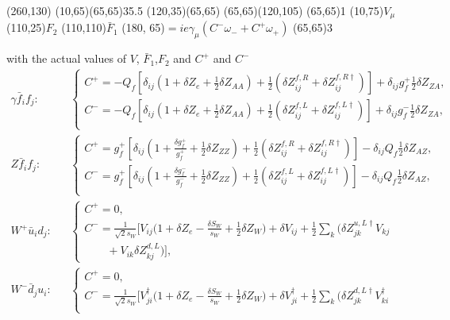 \begin{axopicture}(260,130) %
	\Photon(10,65)(65,65){3}{5.5}
	\Line[arrow](120,35)(65,65)
	\Line[arrow](65,65)(120,105)
	\Vertex(65,65){1}		
	\Text(10,75){$V_\mu$}
	\Text(110,25){$F_2$}
	\Text(110,110){$\bar{F}_1$}
	\Text(180, 65){$=ie\gamma_{\mu}(C^-\omega_-+C^+\omega_+)$}
	\Vertex(65,65){3}
\end{axopicture}
\newline with the actual values of $V$, $\bar{F}_1$,$F_2$ and $C^+$ and $C^-$
\begin{eqnarray}
\gamma\bar{f}_if_j:&&
\begin{cases}
C^+=-Q_f[ \delta_{ij}( 1+\delta Z_e+\frac{1}{2}\delta Z_{AA})+\frac{1}{2}(\delta Z^{f,R}_{ij}+\delta Z^{f,R\dagger}_{ij})]+\delta_{ij}g^+_f\frac{1}{2}\delta Z_{ZA},\\
C^-=-Q_f[ \delta_{ij}( 1+\delta Z_e+\frac{1}{2}\delta Z_{AA})+\frac{1}{2}(\delta Z^{f,L}_{ij}+\delta Z^{f,L\dagger}_{ij})]+\delta_{ij}g^-_f\frac{1}{2}\delta Z_{ZA},\\
\end{cases}\nonumber\\
Z\bar{f}_if_j:&&
\begin{cases}
C^+=g^+_f[ \delta_{ij}( 1+\frac{\delta g^+_f}{g^+_f}+\frac{1}{2}\delta Z_{ZZ})+\frac{1}{2}(\delta Z^{f,R}_{ij}+\delta Z^{f,R\dagger}_{ij})]-\delta_{ij}Q_f\frac{1}{2}\delta Z_{AZ},\\
C^-=g^+_f[ \delta_{ij}( 1+\frac{\delta g^-_f}{g^-_f}+\frac{1}{2}\delta Z_{ZZ})+\frac{1}{2}(\delta Z^{f,L}_{ij}+\delta Z^{f,L\dagger}_{ij})]-\delta_{ij}Q_f\frac{1}{2}\delta Z_{AZ},\\
\end{cases}\nonumber\\
W^+\bar{u}_id_j:&&
\begin{cases}
C^+=0,\\
C^-=\frac{1}{\sqrt{2}s_W}\biggl[V_{ij}\biggl(1+\delta Z_e-\frac{\delta S_W}{s_W}+\frac{1}{2}\delta Z_W\biggr)+\delta V_{ij}
+\frac{1}{2}\sum_k(\delta Z^{u,L\dagger}_{jk}V_{kj}\\
\quad\quad+V_{ik}\delta Z^{d,L}_{kj})\biggr],
\end{cases}\nonumber\\
W^-\bar{d}_ju_i:&&
\begin{cases}
C^+=0,\\
C^-=\frac{1}{\sqrt{2}s_W}\biggl[V_{ji}^\dagger\biggl(1+\delta Z_e-\frac{\delta S_W}{s_W}+\frac{1}{2}\delta Z_W\biggr)+\delta V_{ji}^\dagger
+\frac{1}{2}\sum_k(\delta Z^{d,L\dagger}_{jk}V_{ki}^\dagger\\

\end{cases}
\end{eqnarray}
